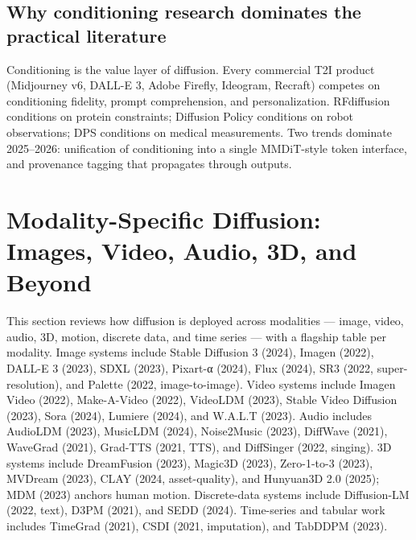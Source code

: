 \subsection{Why conditioning research dominates the practical literature}\label{why-conditioning-research-dominates-the-practical-literature}

Conditioning is the value layer of diffusion. Every commercial T2I product (Midjourney v6, DALL-E 3, Adobe Firefly, Ideogram, Recraft) competes on conditioning fidelity, prompt comprehension, and personalization. RFdiffusion conditions on protein constraints; Diffusion Policy conditions on robot observations; DPS conditions on medical measurements. Two trends dominate 2025--2026: unification of conditioning into a single MMDiT-style token interface, and provenance tagging that propagates through outputs.

\section{Modality-Specific Diffusion: Images, Video, Audio, 3D, and Beyond}\label{modality-specific-diffusion-images-video-audio-3d-and-beyond}

This section reviews how diffusion is deployed across modalities --- image, video, audio, 3D, motion, discrete data, and time series --- with a flagship table per modality. Image systems include Stable Diffusion 3 (2024), Imagen (2022), DALL-E 3 (2023), SDXL (2023), Pixart-α (2024), Flux (2024), SR3 (2022, super-resolution), and Palette (2022, image-to-image). Video systems include Imagen Video (2022), Make-A-Video (2022), VideoLDM (2023), Stable Video Diffusion (2023), Sora (2024), Lumiere (2024), and W.A.L.T (2023). Audio includes AudioLDM (2023), MusicLDM (2024), Noise2Music (2023), DiffWave (2021), WaveGrad (2021), Grad-TTS (2021, TTS), and DiffSinger (2022, singing). 3D systems include DreamFusion (2023), Magic3D (2023), Zero-1-to-3 (2023), MVDream (2023), CLAY (2024, asset-quality), and Hunyuan3D 2.0 (2025); MDM (2023) anchors human motion. Discrete-data systems include Diffusion-LM (2022, text), D3PM (2021), and SEDD (2024). Time-series and tabular work includes TimeGrad (2021), CSDI (2021, imputation), and TabDDPM (2023).

